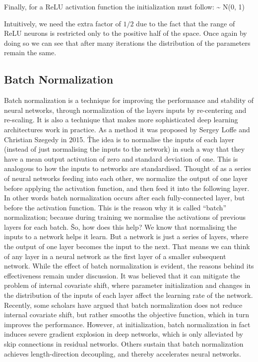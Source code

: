 Finally, for a ReLU activation function the initialization must follow:
\bse
\theta \sim {} N(0, 1)
\ese

Intuitively, we need the extra factor of $1/2$ due to the fact that the range of ReLU neurons is restricted only to 
the positive half of the space. Once again by doing so we can see that after many iterations the distribution of the 
parameters remain the same.


\subsection{Batch Normalization}

Batch normalization is a technique for improving the performance and stability of neural networks, through 
normalization of the layers inputs by re-centering and re-scaling. It is also a technique that makes more 
sophisticated deep learning architectures work in practice. As a method it was proposed by Sergey Loffe and Christian
Szegedy in 2015. \v

The idea is to normalise the inputs of each layer (instead of just normalising the inputs to the network) in such a 
way that they have a mean output activation of zero and standard deviation of one. This is analogous to how the 
inputs to networks are standardised. Thought of as a series of neural networks feeding into each other, we normalize 
the output of one layer before applying the activation function, and then feed it into the following layer. In other 
words batch normalization occurs after each fully-connected layer, but before the activation function. This is the 
reason why it is called ``batch'' normalization; because during training we normalise the activations of previous 
layers for each batch. \v

So, how does this help? We know that normalising the inputs to a network helps it learn. But a network is just a 
series of layers, where the output of one layer becomes the input to the next. That means we can think of any layer 
in a neural network as the first layer of a smaller subsequent network. While the effect of batch normalization is 
evident, the reasons behind its effectiveness remain under discussion. It was believed that it can mitigate the 
problem of internal covariate shift, where parameter initialization and changes in the distribution of the inputs of 
each layer affect the learning rate of the network. Recently, some scholars have argued that batch normalization does
not reduce internal covariate shift, but rather smooths the objective function, which in turn improves the 
performance. However, at initialization, batch normalization in fact induces severe gradient explosion in deep 
networks, which is only alleviated by skip connections in residual networks. Others sustain that batch normalization
achieves length-direction decoupling, and thereby accelerates neural networks.

